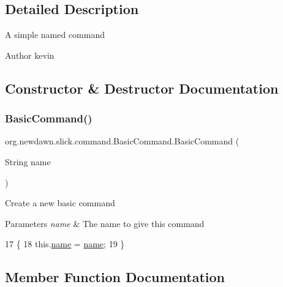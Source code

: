 \subsection{Detailed Description}
A simple named command

\begin{DoxyAuthor}{Author}
kevin 
\end{DoxyAuthor}


\subsection{Constructor \& Destructor Documentation}
\mbox{\label{classorg_1_1newdawn_1_1slick_1_1command_1_1_basic_command_acce30aa06b3b68b146e45f603a2053a8}} 
\subsubsection{\texorpdfstring{Basic\+Command()}{BasicCommand()}}
{\footnotesize\ttfamily org.\+newdawn.\+slick.\+command.\+Basic\+Command.\+Basic\+Command (\begin{DoxyParamCaption}\item[{String}]{name }\end{DoxyParamCaption})\hspace{0.3cm}{\ttfamily [inline]}}

Create a new basic command


\begin{DoxyParams}{Parameters}
{\em name} & The name to give this command \\
\hline
\end{DoxyParams}

\begin{DoxyCode}
17                                      \{
18         this.\mbox{\hyperlink{classorg_1_1newdawn_1_1slick_1_1command_1_1_basic_command_a50a5c3e66d1f02b990807d882daddce2}{name}} = \mbox{\hyperlink{classorg_1_1newdawn_1_1slick_1_1command_1_1_basic_command_a50a5c3e66d1f02b990807d882daddce2}{name}};
19     \}
\end{DoxyCode}


\subsection{Member Function Documentation}
\mbox{\label{classorg_1_1newdawn_1_1slick_1_1command_1_1_basic_command_a67ef131d3d6489ef5fc1bd6f1a595caa}} 
